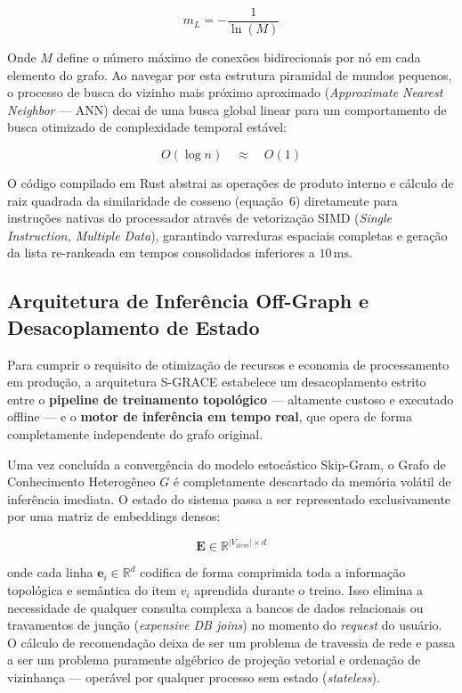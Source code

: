 \documentclass[11pt,a4paper]{article}
\begin{document}
\begin{equation}
m_L = -\frac{1}{\ln(M)}
\end{equation}

Onde $M$ define o número máximo de conexões bidirecionais por nó em cada elemento do grafo. Ao
navegar por esta estrutura piramidal de mundos pequenos, o processo de busca do vizinho mais
próximo aproximado (\textit{Approximate Nearest Neighbor} — ANN) decai de uma busca global linear
para um comportamento de busca otimizado de complexidade temporal estável:

\begin{equation}
O(\log n) \quad \approx \quad O(1)
\end{equation}

O código compilado em Rust abstrai as operações de produto interno e cálculo de raiz quadrada da
similaridade de cosseno (equação~6) diretamente para instruções nativas do processador através de
vetorização SIMD (\textit{Single Instruction, Multiple Data}), garantindo varreduras espaciais
completas e geração da lista re-rankeada em tempos consolidados inferiores a $10\,\text{ms}$.

\subsection{Arquitetura de Inferência Off-Graph e Desacoplamento de Estado}

Para cumprir o requisito de otimização de recursos e economia de processamento em produção, a
arquitetura S-GRACE estabelece um desacoplamento estrito entre o \textbf{pipeline de treinamento
topológico} — altamente custoso e executado offline — e o \textbf{motor de inferência em tempo
real}, que opera de forma completamente independente do grafo original.

Uma vez concluída a convergência do modelo estocástico Skip-Gram, o Grafo de Conhecimento
Heterogêneo $G$ é completamente descartado da memória volátil de inferência imediata. O estado do
sistema passa a ser representado exclusivamente por uma matriz de embeddings densos:

\begin{equation}
\mathbf{E} \in \mathbb{R}^{|V_{item}| \times d}
\end{equation}

onde cada linha $\mathbf{e}_i \in \mathbb{R}^d$ codifica de forma comprimida toda a informação
topológica e semântica do item $v_i$ aprendida durante o treino. Isso elimina a necessidade de
qualquer consulta complexa a bancos de dados relacionais ou travamentos de junção (\textit{expensive
DB joins}) no momento do \textit{request} do usuário. O cálculo de recomendação deixa de ser um
problema de travessia de rede e passa a ser um problema puramente algébrico de projeção vetorial
e ordenação de vizinhança — operável por qualquer processo sem estado (\textit{stateless}).
\end{document}
